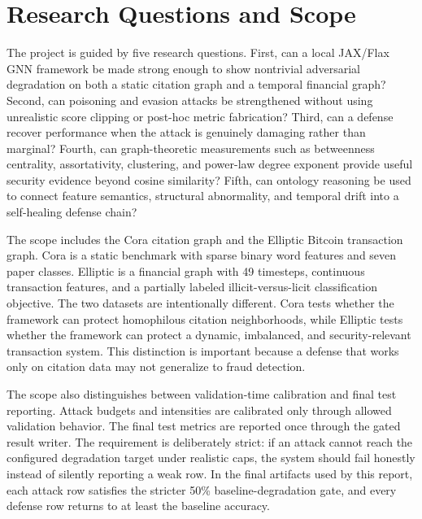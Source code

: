\documentclass[12pt,oneside]{report}
\begin{document}
\section{Research Questions and Scope}
The project is guided by five research questions. First, can a local JAX/Flax GNN framework be made strong enough to show nontrivial adversarial degradation on both a static citation graph and a temporal financial graph? Second, can poisoning and evasion attacks be strengthened without using unrealistic score clipping or post-hoc metric fabrication? Third, can a defense recover performance when the attack is genuinely damaging rather than marginal? Fourth, can graph-theoretic measurements such as betweenness centrality, assortativity, clustering, and power-law degree exponent provide useful security evidence beyond cosine similarity? Fifth, can ontology reasoning be used to connect feature semantics, structural abnormality, and temporal drift into a self-healing defense chain?

The scope includes the Cora citation graph and the Elliptic Bitcoin transaction graph. Cora is a static benchmark with sparse binary word features and seven paper classes. Elliptic is a financial graph with 49 timesteps, continuous transaction features, and a partially labeled illicit-versus-licit classification objective. The two datasets are intentionally different. Cora tests whether the framework can protect homophilous citation neighborhoods, while Elliptic tests whether the framework can protect a dynamic, imbalanced, and security-relevant transaction system. This distinction is important because a defense that works only on citation data may not generalize to fraud detection.

The scope also distinguishes between validation-time calibration and final test reporting. Attack budgets and intensities are calibrated only through allowed validation behavior. The final test metrics are reported once through the gated result writer. The requirement is deliberately strict: if an attack cannot reach the configured degradation target under realistic caps, the system should fail honestly instead of silently reporting a weak row. In the final artifacts used by this report, each attack row satisfies the stricter 50\% baseline-degradation gate, and every defense row returns to at least the baseline accuracy.
\end{document}
